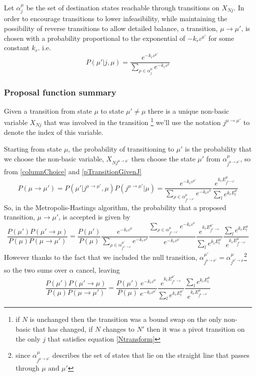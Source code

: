 \documentclass{article}
\begin{document}
Let $\alpha^\mu_j$ be the set of destination states reachable through transitions on $X_{Nj}$. In order to encourage transitions to lower infeasibility, while maintaining the possibility of reverse transitions to allow detailed balance, a transition, $\mu\to\mu'$, is chosen with a probability proportional to the exponential of $-k_r\iota^{\mu'}$ for some constant $k_r$. i.e.
\begin{equation}
P(\mu'|j,\mu) = 
\frac{e^{-k_r\iota^{\mu'}} }
	{\sum_{\rho \in \alpha^\mu_j}  e^{-k_r\iota^\rho}}
\label{pTransitionGivenJ}
\end{equation}

\subsubsection{Proposal function summary}

Given a transition from state $\mu$ to state $\mu' \ne \mu$ there is a unique non-basic variable $X_{Nj}$ that was involved in the transition \footnote{if $N$ is unchanged then the transition was a bound swap on the only non-basic that has changed, if $N$ changes to $N'$ then it was a pivot transition on the only $j$ that satisfies equation \eqref{Ntransform}} we'll use the notation $j^{\mu\to\mu'}$ to denote the index of this variable.

Starting from state $\mu$, the probability of transitioning to $\mu'$ is the probability that we choose the non-basic variable, $X_{Nj^{\mu\to\mu'}}$ then choose the state $\mu'$ from $\alpha^\mu_{j^{\mu\to\mu'}}$, so from \eqref{columnChoice} and \eqref{pTransitionGivenJ}
\[
P(\mu \rightarrow \mu') 
= 
P(\mu'|j^{\mu\to\mu'},\mu)P(j^{\mu\to\mu'}|\mu) 
=
\frac{e^{-k_r \iota^{\mu'}}}
	{\sum_{\rho \in \alpha^\mu_{j^{\mu\to\mu'}}}e^{-k_r\iota^\rho}}
\frac{e^{k_c E^\mu_{j^{\mu\to\mu'}}}}
	{\sum_l e^{k_c E^\mu_l}}
\]
So, in the Metropolis-Hastings algorithm, the probability that a proposed transition, $\mu\to\mu'$, is accepted is given by
\[
\frac{P(\mu')P(\mu'\to\mu)}{P(\mu)P(\mu\to\mu')} 
=
\frac{P(\mu')}
	{P(\mu)}
\frac{e^{-k_r \iota^{\mu}}}
	{\sum_{\rho \in \alpha^{\mu'}_{j^{\mu'\to\mu}}}e^{-k_r\iota^\rho}}
\frac{\sum_{\rho \in \alpha^{\mu}_{j^{\mu\to\mu'}}}e^{-k_r\iota^\rho}}
	{e^{-k_r \iota^{\mu'}}}
\frac{e^{k_c E^{\mu'}_{j^{\mu'\to\mu}}}}
	{\sum_l e^{k_c E^{\mu'}_l}}
\frac{\sum_l e^{k_c E^\mu_l}}
	{e^{k_c E^\mu_{j^{\mu\to\mu'}}}}
\]
However thanks to the fact that we included the null transition,  $\alpha^{\mu'}_{j^{\mu\to\mu'}} = \alpha^\mu_{j^{\mu'\to\mu}}$\footnote{since $\alpha^\mu_{j^{\mu\to\mu'}}$ describes the set of states that lie on the straight line that passes through $\mu$ and $\mu'$} so the two sums over $\alpha$ cancel, leaving
\begin{equation}
\frac{P(\mu')P(\mu'\to\mu)}
	{P(\mu)P(\mu\to\mu')} 
=
\frac{P(\mu')}
	{P(\mu)}
\frac{e^{-k_r \iota^{\mu}}}
	{e^{-k_r \iota^{\mu'}}}
\frac{e^{k_c E^{\mu'}_{j^{\mu'\to\mu}}}}
	{\sum_l e^{k_c E^{\mu'}_l}}
\frac{\sum_l e^{k_c E^\mu_l}}
	{e^{k_c E^\mu_{j^{\mu\to\mu'}}}}
\label{acceptance1}
\end{equation}
\end{document}
